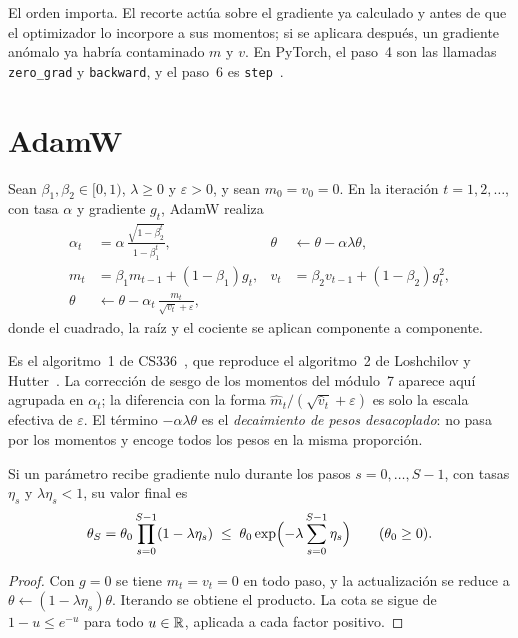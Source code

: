 El orden importa. El recorte actúa sobre el gradiente ya calculado y antes de que el optimizador lo incorpore a sus momentos; si se aplicara después, un gradiente anómalo ya habría contaminado $m$ y $v$. En PyTorch, el paso~4 son las llamadas \texttt{zero\_grad} y \texttt{backward}, y el paso~6 es \texttt{step}~\cite[§4.2.1]{cs336}.

\section{AdamW}

\begin{definicion}\label{def:adamw-impl}
Sean $\beta_1,\beta_2\in[0,1)$, $\lambda\ge 0$ y $\varepsilon>0$, y sean $m_0=v_0=0$. En la iteración $t=1,2,\dots$, con tasa $\alpha$ y gradiente $g_t$, AdamW realiza
\begin{align*}
\alpha_t&=\alpha\,\frac{\sqrt{1-\beta_2^{t}}}{1-\beta_1^{t}}, &
\theta&\leftarrow\theta-\alpha\lambda\theta,\\
m_t&=\beta_1 m_{t-1}+(1-\beta_1)g_t, &
v_t&=\beta_2 v_{t-1}+(1-\beta_2)g_t^{2},\\
\theta&\leftarrow\theta-\alpha_t\,\frac{m_t}{\sqrt{v_t}+\varepsilon}, &&
\end{align*}
donde el cuadrado, la raíz y el cociente se aplican componente a componente.
\end{definicion}

Es el algoritmo~1 de CS336~\cite[§4.3]{cs336}, que reproduce el algoritmo~2 de Loshchilov y Hutter~\cite{adamw}. La corrección de sesgo de los momentos del módulo~7 aparece aquí agrupada en $\alpha_t$; la diferencia con la forma $\hat m_t/(\sqrt{\hat v_t}+\varepsilon)$ es solo la escala efectiva de $\varepsilon$. El término $-\alpha\lambda\theta$ es el \emph{decaimiento de pesos desacoplado}: no pasa por los momentos y encoge todos los pesos en la misma proporción.

\begin{proposicion}\label{prop:encoge}
Si un parámetro recibe gradiente nulo durante los pasos $s=0,\dots,S-1$, con tasas $\eta_s$ y $\lambda\eta_s<1$, su valor final es
\[
\theta_S=\theta_0\prod_{s=0}^{S-1}(1-\lambda\eta_s)\;\le\;\theta_0\exp\Bigl(-\lambda\sum_{s=0}^{S-1}\eta_s\Bigr)\qquad(\theta_0\ge 0).
\]
\end{proposicion}

\begin{proof}
Con $g=0$ se tiene $m_t=v_t=0$ en todo paso, y la actualización se reduce a $\theta\leftarrow(1-\lambda\eta_s)\theta$. Iterando se obtiene el producto. La cota se sigue de $1-u\le e^{-u}$ para todo $u\in\mathbb{R}$, aplicada a cada factor positivo.
\end{proof}

